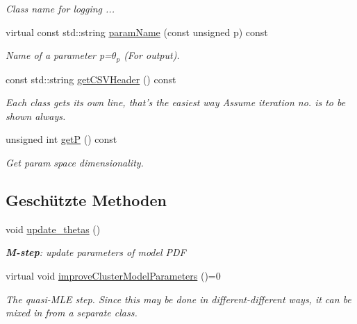 \begin{DoxyCompactItemize}
\begin{DoxyCompactList}\small\item\em Class name for logging ... \item\end{DoxyCompactList}\item 
virtual const std::string \hyperlink{classCDA_1_1EMGenericMixtureModelCore_a25afd2a5587cc649efe6c953d168198f}{paramName} (const unsigned p) const 
\begin{DoxyCompactList}\small\item\em Name of a parameter p=$\theta_p$ (For output). \item\end{DoxyCompactList}\item 
const std::string \hyperlink{classCDA_1_1EMGenericMixtureModelCore_a10bd69fd4b420a274aee5f10e09ed5fe}{getCSVHeader} () const 
\begin{DoxyCompactList}\small\item\em Each class gets its own line, that's the easiest way Assume iteration no. is to be shown always. \item\end{DoxyCompactList}\item 
unsigned int \hyperlink{classCDA_1_1EMGenericMixtureModelCore_a17fbd5259ce15213dc4087c105b4a03e}{getP} () const 
\begin{DoxyCompactList}\small\item\em Get param space dimensionality. \item\end{DoxyCompactList}\end{DoxyCompactItemize}
\subsection*{Geschützte Methoden}
\begin{DoxyCompactItemize}
\item 
void \hyperlink{classCDA_1_1EMGenericMixtureModelCore_a12c68e86652d9a723ca0716f7676b360}{update\_\-thetas} ()
\begin{DoxyCompactList}\small\item\em {\bfseries M-\/step}: update parameters of model PDF \item\end{DoxyCompactList}\item 
virtual void \hyperlink{classCDA_1_1EMGenericMixtureModelCore_aed2b50eb2bb8582204e186e3d5834c0a}{improveClusterModelParameters} ()=0
\begin{DoxyCompactList}\small\item\em The quasi-\/MLE step. Since this may be done in different-\/different ways, it can be mixed in from a separate class. \item\end{DoxyCompactList}\end{DoxyCompactItemize}
